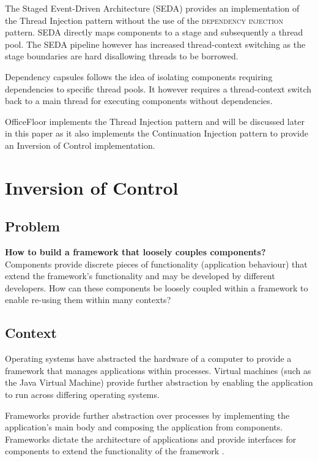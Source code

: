 \documentclass[prodmode]{style/acmlarge}
\begin{document}
The Staged Event-Driven Architecture (SEDA) \cite{seda} provides an
implementation of the Thread Injection pattern without the use of the
\textsc{dependency injection} pattern.  SEDA directly maps components to a stage
and subsequently a thread pool.  The SEDA pipeline however has increased
thread-context switching as the stage boundaries are hard disallowing threads to
be borrowed.

Dependency capsules \cite{dependency-capsules} follows the idea of isolating
components requiring dependencies to specific thread pools.  It however requires
a thread-context switch back to a main thread for executing components without
dependencies.

OfficeFloor \cite{officefloor} implements the Thread Injection pattern and will
be discussed later in this paper as it also implements the Continuation
Injection pattern to provide an Inversion of Control implementation.



\section{Inversion of Control}


\subsection{Problem}

\textbf{How to build a framework that loosely couples components?} Components
provide discrete pieces of functionality (application behaviour) that extend the
framework's functionality and may be developed by different developers.  How can
these components be loosely coupled within a framework to enable re-using them
within many contexts?


\subsection{Context}

Operating systems have abstracted the hardware of a computer to provide a
framework that manages applications within processes.  Virtual machines (such as
the Java Virtual Machine) provide further abstraction by enabling the
application to run across differing operating systems.

Frameworks provide further abstraction over processes by implementing the
application's main body and composing the application from components. 
Frameworks dictate the architecture of applications and provide interfaces for
components to extend the functionality of the framework \cite{gof}.
\end{document}
